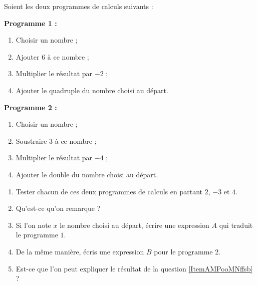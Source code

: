 
\begin{exercice}\label{exosmath-0807}

Soient les deux programmes de calculs suivants :

\begin{framed}
    {\bf Programme 1 :}
\begin{enumerate}
    \item
 Choisir un nombre ;
\item
 Ajouter $6$ à ce nombre ;
\item
 Multiplier le résultat par $-2$ ;
\item
 Ajouter le quadruple du nombre choisi au départ.
\end{enumerate}
\end{framed}
\begin{framed}
    {\bf Programme 2 :}
\begin{enumerate}
    \item
 Choisir un nombre ;
    \item
 Soustraire $3$ à ce nombre ;
    \item
 Multiplier le résultat par $-4$ ;
    \item
 Ajouter le double du nombre choisi au départ.
\end{enumerate}
\end{framed}

\begin{enumerate}
    \item
 Tester chacun de ces deux programmes de calculs en partant $2$, $-3$ et $4$.
\item   \label{ItemAMPooMNffsb}
    Qu'est-ce qu'on remarque ?
\item
 Si l'on note $x$ le nombre choisi au départ, écrire une expression $A$ qui traduit le programme $1$.
\item
 De la même manière, écris une expression $B$ pour le programme $2$.
\item
    Est-ce que l'on peut expliquer le résultat de la question \ref{ItemAMPooMNffsb} ?
\end{enumerate}

\end{exercice}
